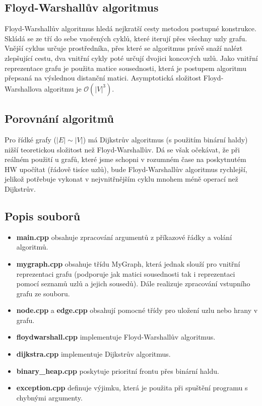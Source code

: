 \documentclass[a4paper,11pt]{article}
\begin{document}
\subsection{Floyd-Warshallův algoritmus}
Floyd-Warshallův algoritmus hledá nejkratší cesty metodou postupné konstrukce. Skládá se ze tří do sebe vnořených cyklů, které iterují přes všechny uzly grafu. Vnější cyklus určuje prostředníka, přes které se algoritmus právě snaží nalézt zlepšující cestu, dva vnitřní cykly poté určují dvojici koncových uzlů.
Jako vnitřní reprezentace grafu je použita matice sousednosti, která je postupem algoritmu přepsaná na výslednou distanční matici. Asymptotická složitost Floyd-Warshallova algoritmu je $\mathcal{O}(|V|^3)$.

\subsection{Porovnání algoritmů}
Pro řídké grafy ($|E|\sim|V|$) má Dijkstrův algoritmus (s použitím binární haldy) nižší teoretickou složitost než Floyd-Warshallův. Dá se však očekávat, že při reálném použití u grafů, které jsme schopni v rozumném čase na poskytnutém HW upočítat (řádově tisíce uzlů), bude Floyd-Warshallův algoritmus rychlejší, jelikož potřebuje vykonat v nejvnitřnějším cyklu mnohem méně operací než Dijkstrův.

\subsection{Popis souborů}
\begin{itemize}
 \item \textbf{main.cpp} obsahuje zpracování argumentů z příkazové řádky a volání algoritmů.
 \item \textbf{mygraph.cpp} obsahuje třídu MyGraph, která jednak slouží pro vni\-třní reprezentaci grafu (podporuje jak matici sousednosti tak i reprezentaci pomocí seznamů uzlů a jejich sousedů). Dále realizuje zpracování vstupního grafu ze souboru.
 \item \textbf{node.cpp} a \textbf{edge.cpp} obsahují pomocné třídy pro uložení uzlu nebo hrany v grafu.
 \item \textbf{floydwarshall.cpp} implementuje Floyd-Warshallův algoritmus.
 \item \textbf{dijkstra.cpp} implementuje Dijkstrův algoritmus.
 \item \textbf{binary\_heap.cpp} poskytuje prioritní frontu přes binární haldu.
 \item \textbf{exception.cpp} definuje výjimku, která je použita při spuštění programu s chybnými argumenty.
\end{itemize}
\end{document}
